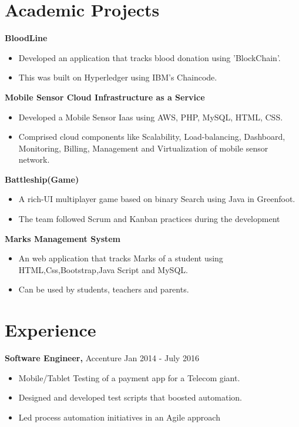 \documentclass[margin]{res}
\begin{document}
\begin{resume}
\section{Academic Projects}
 
 {\bf BloodLine }
 \begin{itemize} \itemsep -2pt  %
 \item Developed an application that tracks blood donation using 'BlockChain'.
 \item This was built on Hyperledger using IBM's Chaincode.
 \end{itemize}
 
 {\bf Mobile Sensor Cloud Infrastructure as a Service }
 \begin{itemize} \itemsep -2pt  %
 \item Developed a Mobile Sensor Iaas  using  AWS, PHP, MySQL, HTML, CSS.
 \item Comprised cloud components like Scalability, Load-balancing, Dashboard, Monitoring, Billing, Management and Virtualization of mobile sensor network.
 \end{itemize}
 
 {\bf Battleship(Game) }
 \begin{itemize} \itemsep -2pt  %
 \item A rich-UI multiplayer game based on binary Search using Java in Greenfoot.
 \item The team followed Scrum and Kanban practices during the development 
 \end{itemize}

 
 {\bf Marks Management System }
 \begin{itemize} \itemsep -2pt  %
 \item An web application that tracks Marks of a student using HTML,Css,Bootstrap,Java Script and MySQL.
 \item Can be used by students, teachers and parents.
 \end{itemize}
\section{Experience}

 {\bf Software Engineer,} Accenture \hfill Jan  2014  - July 2016
 \begin{itemize} \itemsep -2pt  %
 \item Mobile/Tablet Testing of a payment app for a Telecom giant. 
 \item Designed and developed test scripts that boosted automation.
 \item Led process automation initiatives in an Agile approach 
 \end{itemize}
 

\end{resume}
\end{document}
